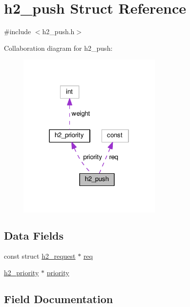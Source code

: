 \hypertarget{structh2__push}{}\section{h2\+\_\+push Struct Reference}
\label{structh2__push}


{\ttfamily \#include $<$h2\+\_\+push.\+h$>$}



Collaboration diagram for h2\+\_\+push\+:
\nopagebreak
\begin{figure}[H]
\begin{center}
\leavevmode
\includegraphics[width=202pt]{structh2__push__coll__graph}
\end{center}
\end{figure}
\subsection*{Data Fields}
\begin{DoxyCompactItemize}
\item 
const struct \hyperlink{structh2__request}{h2\+\_\+request} $\ast$ \hyperlink{structh2__push_a4541bdab05a10c6a58a413b0493c1a80}{req}
\item 
\hyperlink{structh2__priority}{h2\+\_\+priority} $\ast$ \hyperlink{structh2__push_a79d7ef1a9ad462fb988ee537a0d45662}{priority}
\end{DoxyCompactItemize}


\subsection{Field Documentation}
